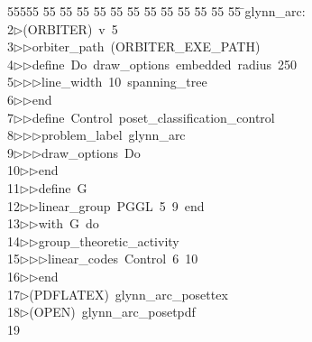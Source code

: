 %
%
\begin{tabbing}
55555 \= 55 \= 55 \= 55 \= 55 \= 55 \= 55 \= 55 \= 55 \= 55 \= 55 \= 55 \= 55 \= \>glynn\_arc:\\[0pt]
2\>$\triangleright$\>(ORBITER)\ v\ 5\ \\[0pt]
3\>$\triangleright$\>$\triangleright$\>orbiter\_path\ (ORBITER\_EXE\_PATH)\ \\[0pt]
4\>$\triangleright$\>$\triangleright$\>define\ Do\ draw\_options\ embedded\ radius\ 250\ \\[0pt]
5\>$\triangleright$\>$\triangleright$\>$\triangleright$\>line\_width\ 10\ spanning\_tree\ \\[0pt]
6\>$\triangleright$\>$\triangleright$\>end\ \\[0pt]
7\>$\triangleright$\>$\triangleright$\>define\ Control\ poset\_classification\_control\ \\[0pt]
8\>$\triangleright$\>$\triangleright$\>$\triangleright$\>problem\_label\ glynn\_arc\ \\[0pt]
9\>$\triangleright$\>$\triangleright$\>$\triangleright$\>draw\_options\ Do\ \\[0pt]
10\>$\triangleright$\>$\triangleright$\>end\ \\[0pt]
11\>$\triangleright$\>$\triangleright$\>define\ G\ \\[0pt]
12\>$\triangleright$\>$\triangleright$\>linear\_group\ PGGL\ 5\ 9\ end\ \\[0pt]
13\>$\triangleright$\>$\triangleright$\>with\ G\ do\ \\[0pt]
14\>$\triangleright$\>$\triangleright$\>group\_theoretic\_activity\ \\[0pt]
15\>$\triangleright$\>$\triangleright$\>$\triangleright$\>linear\_codes\ Control\ 6\ 10\ \\[0pt]
16\>$\triangleright$\>$\triangleright$\>end\\[0pt]
17\>$\triangleright$\>(PDFLATEX)\ glynn\_arc\_posettex\\[0pt]
18\>$\triangleright$\>(OPEN)\ glynn\_arc\_posetpdf\\[0pt]
19\>\end{tabbing}

